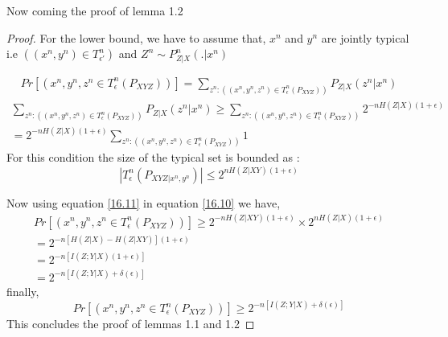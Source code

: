 \documentclass{article}
\begin{document}
Now coming the proof of lemma 1.2 \\
\begin{proof}
 For the lower bound, we have to assume that, $x^n$ and $y^n$  are jointly typical i.e $\left( (x^n,y^n) \in T^{n}_{\epsilon'}\right)$ and $Z^n \sim P^{n}_{Z|X}\left( .|x^n\right)$
 
 \begin{align}
 	Pr \left[ \left( x^n,y^n,z^n \in T^{n}_{\epsilon} \left(  P_{XYZ} \right)\right)\right] = \sum_{z^{n} : \left( (x^n,y^n,z^n )\in T^{n}_{\epsilon} \left(  P_{XYZ} \right) \right) }  P_{Z|X} \left( z^n|x^n \right)  \label{16.8}
 \end{align}
\begin{align}
\sum_{z^{n} : \left( (x^n,y^n,z^n )\in T^{n}_{\epsilon} \left(  P_{XYZ} \right) \right) }  P_{Z|X} \left( z^n|x^n \right)	\geq   \sum_{z^{n} : \left( (x^n,y^n,z^n )\in T^{n}_{\epsilon} \left(  P_{XYZ} \right) \right) } 2^{-nH(Z|X) (1 +\epsilon)}\\
=  2^{-nH(Z|X) (1 +\epsilon)}  \sum_{z^{n} : \left( (x^n,y^n,z^n )\in T^{n}_{\epsilon} \left(  P_{XYZ} \right) \right) } 1 \label{16.10}
\end{align} 
 For this condition the size of the typical set is bounded as :
 \begin{equation}
 	|T^{n}_{\epsilon} \left(  P_{XYZ|x^n, y^n} \right) | \leq  2^{nH(Z|XY) (1 +\epsilon)} \label{16.11}
 \end{equation}
 
 Now using equation \eqref{16.11} in equation \eqref{16.10} we have,
 \begin{align*}
 Pr \left[ \left( x^n,y^n,z^n \in T^{n}_{\epsilon} \left(  P_{XYZ} \right)\right)\right] \geq 2^{-nH(Z|XY) (1 +\epsilon)} \times   2^{nH(Z|X) (1 +\epsilon)}\\
 =  2^{ -n \left[ H(Z|X) - H(Z|XY)\right] (1+ \epsilon)} \\ = 2^{ -n \left[I\left( Z ; Y|X\right)(1+\epsilon)\right]}\\
 = 2^{ -n \left[I\left( Z ; Y|X\right) + \delta(\epsilon)\right]}
 \end{align*}
 finally,
 \begin{equation}
  Pr \left[ \left( x^n,y^n,z^n \in T^{n}_{\epsilon} \left(  P_{XYZ} \right)\right)\right] \geq 2^{ -n \left[I\left( Z ; Y|X\right) + \delta(\epsilon)\right]}
 \end{equation} 
This concludes the proof of lemmas 1.1 and 1.2
\end{proof}
\end{document}

